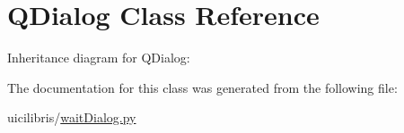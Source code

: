 \hypertarget{classQDialog}{\section{\-Q\-Dialog \-Class \-Reference}
\label{classQDialog}
}


\-Inheritance diagram for \-Q\-Dialog\-:


\-The documentation for this class was generated from the following file\-:\begin{DoxyCompactItemize}
\item 
uicilibris/\hyperlink{waitDialog_8py}{wait\-Dialog.\-py}\end{DoxyCompactItemize}
